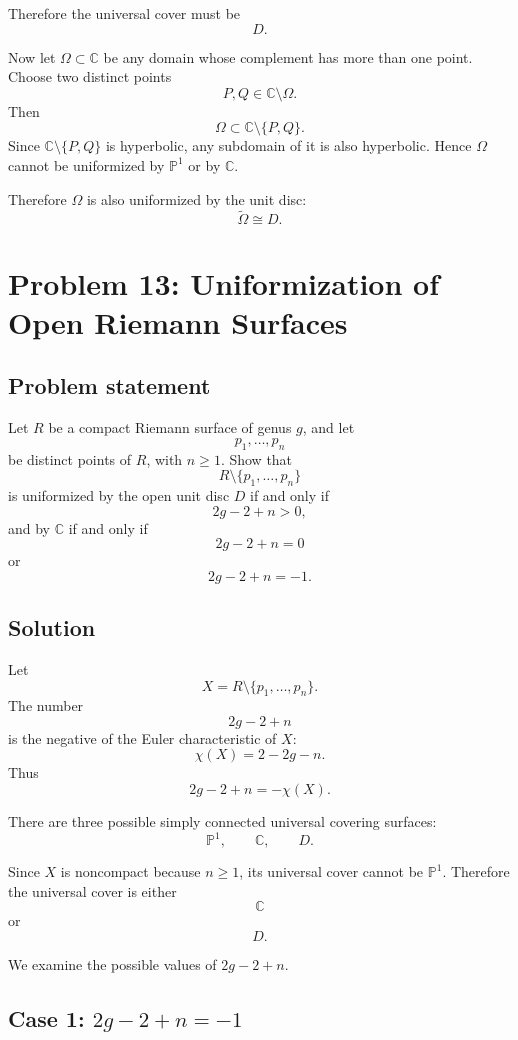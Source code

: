 \documentclass[12pt,a4paper]{article}
\theoremstyle{notespace}
\begin{document}
Therefore the universal cover must be
\[
D.
\]

Now let \(\Omega\subset \mathbb C\) be any domain whose complement has more than one point. Choose two distinct points
\[
P,Q\in \mathbb C\setminus \Omega.
\]
Then
\[
\Omega\subset \mathbb C\setminus\{P,Q\}.
\]
Since \(\mathbb C\setminus\{P,Q\}\) is hyperbolic, any subdomain of it is also hyperbolic. Hence \(\Omega\) cannot be uniformized by \(\mathbb P^1\) or by \(\mathbb C\).

Therefore \(\Omega\) is also uniformized by the unit disc:
\[
\widetilde{\Omega}\cong D.
\]

\section{Problem 13: Uniformization of Open Riemann Surfaces}

\subsection*{Problem statement}

Let \(R\) be a compact Riemann surface of genus \(g\), and let
\[
p_1,\dots,p_n
\]
be distinct points of \(R\), with \(n\geq 1\). Show that
\[
R\setminus\{p_1,\dots,p_n\}
\]
is uniformized by the open unit disc \(D\) if and only if
\[
2g-2+n>0,
\]
and by \(\mathbb C\) if and only if
\[
2g-2+n=0
\]
or
\[
2g-2+n=-1.
\]

\subsection*{Solution}

Let
\[
X=R\setminus\{p_1,\dots,p_n\}.
\]
The number
\[
2g-2+n
\]
is the negative of the Euler characteristic of \(X\):
\[
\chi(X)=2-2g-n.
\]
Thus
\[
2g-2+n=-\chi(X).
\]

There are three possible simply connected universal covering surfaces:
\[
\mathbb P^1,\qquad \mathbb C,\qquad D.
\]

Since \(X\) is noncompact because \(n\geq 1\), its universal cover cannot be \(\mathbb P^1\). Therefore the universal cover is either
\[
\mathbb C
\]
or
\[
D.
\]

We examine the possible values of \(2g-2+n\).

\subsection*{Case 1: \(2g-2+n=-1\)}
\end{document}
